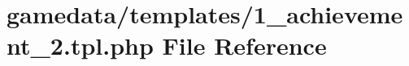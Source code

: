 \hypertarget{1__achievement__2_8tpl_8php}{\section{gamedata/templates/1\+\_\+achievement\+\_\+2.tpl.\+php File Reference}
\label{1__achievement__2_8tpl_8php}
}

